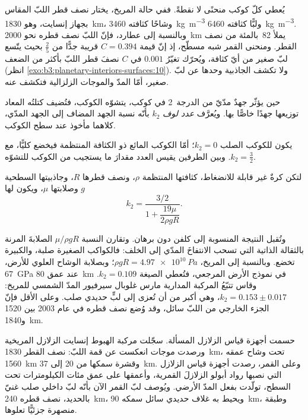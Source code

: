 يُعطي كلّ كوكب منحنًى لا نقطةً. ففي حالة المريخ، يختار نصف قطر اللبّ
المقاس بجهاز إنسايت، وهو \qty{1830}{km}، وشاحًا كثافته \qty{3460}{kg.m^{-3}}
ولبًّا كثافته \qty{6460}{kg.m^{-3}}. وبالنسبة إلى عطارد، فإنّ اللبّ نصف قطره نحو
\qty{2000}{km} يملأ 82~بالمئة من نصف القطر. ومنحنى القمر
شبه مسطّح، إذ إنّ قيمة $C = 0.394$ قريبة جدًّا من $\tfrac25$ بحيث يتّسع لبّ صغير
من أيّ كثافة، ويُحرّك تغيّرُ $0.001$ في $C$ نصفَ قطر اللبّ
بأكثر من الضعف (انظر \cref{exo:b3:planetary-interiors-surfaces:10}).
ولا تكشف الجاذبية وحدها عن لبّ صغير، أمّا المدّ والموجات الزلزالية فتكشف عنه.

\begin{definition}\label{def:b3:planetary-interiors-surfaces:love-number}
حين يؤثّر جهدٌ مدّيّ من الدرجة~2 في كوكب، يتشوّه الكوكب، فتُضيف كتلتُه
المعاد توزيعها جهدًا خاصًّا بها. ويُعرَّف
\emph{عدد لوف} $k_2$ بأنّه نسبة الجهد المضاف إلى الجهد المدّي،
كلاهما مأخوذ عند سطح الكوكب.
\end{definition}

يكون للكوكب الصلب $k_2 = 0$؛ أمّا الكوكب المائع ذو الكثافة المنتظمة
فيخضع كليًّا، مع $k_2 = \tfrac32$. وبين الطرفين يقيس العدد مقدارَ
ما يستجيب من الكوكب للتشوّه.

\begin{proposition}\label{prop:b3:planetary-interiors-surfaces:kelvin}
لتكن كرةٌ غير قابلة للانضغاط، كثافتها المنتظمة $\rho$، ونصف قطرها $R$، وجاذبيتها
السطحية $g$ وصلابتها $\mu$، ويكون لها
\[
  k_2 = \frac{3/2}{1 + \dfrac{19\mu}{2\rho g R}} .
\]
\end{proposition}

وتُقبل النتيجة المنسوبة إلى كلفن دون برهان. وتقارن النسبة $\mu/\rho gR$
الصلابةَ المرنة بالثقالة الذاتية التي تسحب الانتفاخَ المدّي
إلى الخلف: فالكواكب الصغيرة صلبة، والكبيرة تخضع. وبالنسبة إلى المريخ، $\rho gR =
\qty{4.97e10}{Pa}$؛ وبصلابة الوشاح العلوي للأرض،
\qty{67}{GPa} عند عمق \qty{80}{km} في نموذج الأرض المرجعي،
فتُعطي الصيغة $k_2 = 0.109$. وقاس تتبّعُ المركبة المدارية مارس غلوبال سيرفيور
المدّ الشمسي للمريخ: $k_2 = 0.153 \pm 0.017$، وهي أكبر من أن تُعزى إلى
لبٍّ حديدي صلب. وعلى الأقل فإنّ الجزء الخارجي من اللبّ سائل،
وقد وُضع نصف قطره في عام 2003 بين 1520 و\qty{1840}{km}.

حسمت أجهزة قياس الزلازل المسألة. سجّلت مركبة الهبوط إنسايت
الزلازل المريخية ورصدت موجات انعكست عن قمة اللبّ: نصف القطر
\qty{1830}{km}، تحت وشاح عمقه \qty{1560}{km} وقشرة سمكها من 20 إلى
\qty{37}{km}. وعلى القمر، رصدت أجهزة قياس الزلازل التي نصبها رواد
أبولو الزلازلَ القمرية، وأعمقها على عمق مئات
الكيلومترات تحت السطح، تولّدت بفعل المدّ الأرضي. ويُوصف لبّ القمر الآن بأنّه لبّ داخلي
صلب غنيّ بالحديد، نصف قطره \qty{240}{km}، ويحيط به غلاف حديدي سائل سمكه
\qty{90}{km}، وطبقة منصهرة جزئيًّا
تعلوها.

